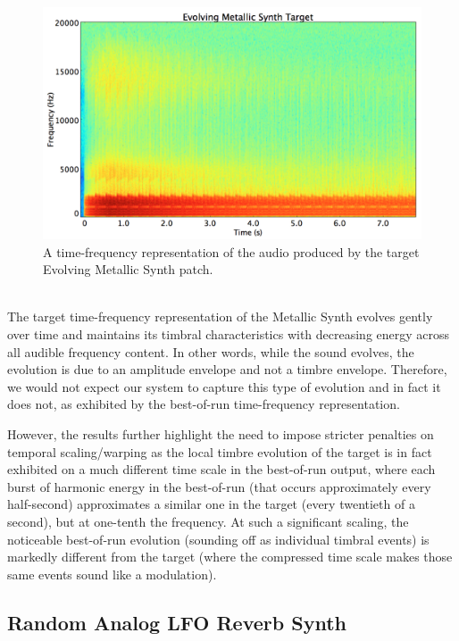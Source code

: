 \documentclass[a4paper,12pt]{report} 	%
\numberwithin{figure}{chapter}
\numberwithin{table}{chapter}
\numberwithin{equation}{chapter}
\begin{document}
\begin{flushleft}
\begin{figure}[h!]
\begin{center}
\includegraphics[scale=0.35,width=\linewidth]{EvolvingMetallicSynthTargetSTFT}
\caption[Target Evolving Metallic Synth Time-Frequency Representation]{A time-frequency representation of the audio produced by the target Evolving Metallic Synth patch.}
\end{center}
\end{figure}
\\
\clearpage
The target time-frequency representation of the Metallic Synth evolves gently over time and maintains its timbral characteristics with decreasing energy across all audible frequency content. In other words, while the sound evolves, the evolution is due to an amplitude envelope and not a timbre envelope. Therefore, we would not expect our system to capture this type of evolution and in fact it does not, as exhibited by the best-of-run time-frequency representation.

However, the results further highlight the need to impose stricter penalties on temporal scaling/warping as the local timbre evolution of the target is in fact exhibited on a much different time scale in the best-of-run output, where each burst of harmonic energy in the best-of-run (that occurs approximately every half-second) approximates a similar one in the target (every twentieth of a second), but at one-tenth the frequency. At such a significant scaling, the noticeable best-of-run evolution (sounding off as individual timbral events) is markedly different from the target (where the compressed time scale makes those same events sound like a modulation).

\subsection{Random Analog LFO Reverb Synth}


\end{flushleft}
\end{document}
